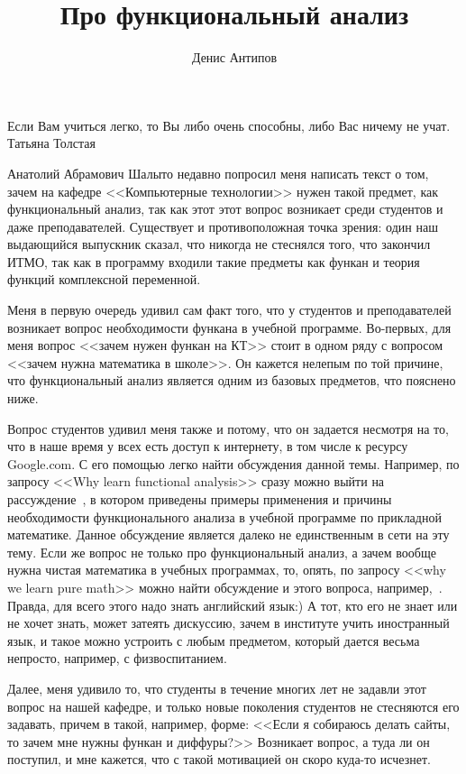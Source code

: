 \documentclass[russian]{article}
\title{Про функциональный анализ}
\author{Денис Антипов}
\begin{document}
\maketitle

Если Вам учиться легко, то Вы либо очень способны, либо Вас ничему не учат.
Татьяна Толстая

Анатолий Абрамович Шалыто недавно попросил меня написать текст о том, зачем на кафедре <<Компьютерные технологии>> нужен такой предмет, как функциональный анализ, так как этот этот вопрос возникает среди студентов и даже преподавателей. Существует и противоположная точка зрения: один наш выдающийся выпускник сказал, что никогда не стеснялся того, что закончил ИТМО, так как в программу входили такие предметы как функан и теория функций комплексной переменной.

Меня в первую очередь удивил сам факт того, что у студентов и преподавателей возникает вопрос необходимости функана в учебной программе. Во-первых, для меня вопрос <<зачем нужен функан на КТ>> стоит в одном ряду с вопросом <<зачем нужна математика в школе>>. Он кажется нелепым по той причине, что функциональный анализ является одним из базовых предметов, что пояснено ниже. %

Вопрос студентов удивил меня также и потому, что он задается несмотря на то, что в наше время у всех есть доступ к интернету, в том числе к ресурсу Google.com. С его помощью легко найти обсуждения данной темы. Например, по запросу <<Why learn functional analysis>> сразу можно выйти на рассуждение~\cite{why-funcan}, в котором приведены примеры применения и причины необходимости функционального анализа в учебной программе по прикладной математике. Данное обсуждение является далеко не единственным в сети на эту тему. Если же вопрос не только про функциональный анализ, а зачем вообще нужна чистая математика в учебных программах, то, опять, по запросу <<why we learn pure math>> можно найти обсуждение и этого вопроса, например,~\cite{why-pure-math}. Правда, для всего этого надо знать английский язык:) А тот, кто его не знает или не хочет знать, может затеять дискуссию, зачем в институте учить иностранный язык, и такое можно устроить с любым предметом, который дается весьма непросто, например, с физвоспитанием.

Далее, меня удивило то, что студенты в течение многих лет не задавли этот вопрос на нашей кафедре, и только новые поколения студентов не стесняются его задавать, причем в такой, например, форме: <<Если я собираюсь делать сайты, то зачем мне нужны функан и диффуры?>> Возникает вопрос, а туда ли он поступил, и мне кажется, что с такой мотивацией он скоро куда-то исчезнет.
\end{document}
